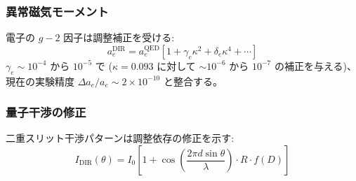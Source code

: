 \documentclass[11pt,a4paper]{article}
\begin{document}
	\subsubsection{異常磁気モーメント}
	電子の $g-2$ 因子は調整補正を受ける:
	\begin{equation}
		a_e^{\text{DIR}} = a_e^{\text{QED}} \left[ 1 + \gamma_e \kappa^2 + \delta_e \kappa^4 + \cdots \right]
	\end{equation}
	$\gamma_e \sim 10^{-4}$ から $10^{-5}$ で ($\kappa=0.093$ に対して $\sim 10^{-6}$ から $10^{-7}$ の補正を与える)、現在の実験精度 $\Delta a_e/a_e \sim 2\times10^{-10}$ と整合する。
	
	\subsubsection{量子干渉の修正}
	二重スリット干渉パターンは調整依存の修正を示す:
	\begin{equation}
		I_{\text{DIR}}(\theta) = I_0 \left[ 1 + \cos\left( \frac{2\pi d \sin\theta}{\lambda} \right) \cdot R \cdot f(D) \right]
	\end{equation}
	
\end{document}
